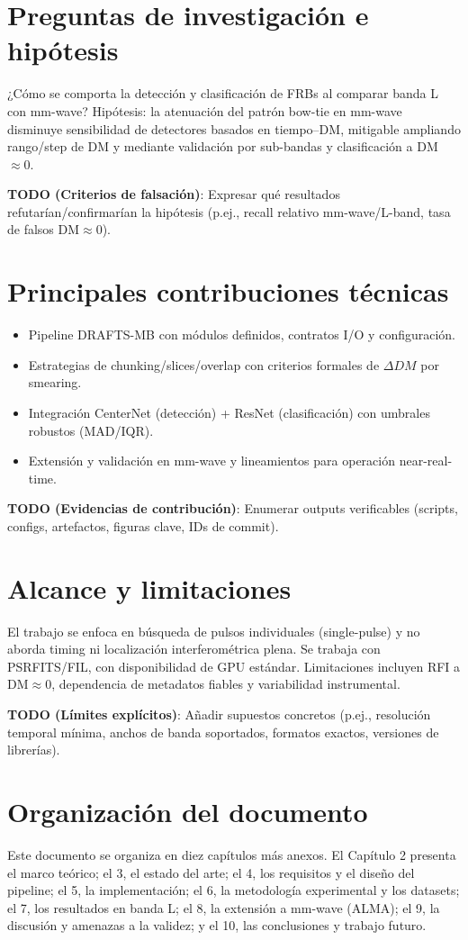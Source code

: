 \section{Preguntas de investigación e hipótesis}
¿Cómo se comporta la detección y clasificación de FRBs al comparar banda L con mm-wave? Hipótesis: la atenuación del patrón bow-tie en mm-wave disminuye sensibilidad de detectores basados en tiempo–DM, mitigable ampliando rango/step de DM y mediante validación por sub-bandas y clasificación a DM\(\approx 0\).

\textbf{TODO (Criterios de falsación)}: Expresar qué resultados refutarían/confirmarían la hipótesis (p.ej., recall relativo mm-wave/L-band, tasa de falsos DM\(\approx\)0).

\section{Principales contribuciones técnicas}
\begin{itemize}
  \item Pipeline DRAFTS-MB con módulos definidos, contratos I/O y configuración.
  \item Estrategias de chunking/slices/overlap con criterios formales de \(\Delta DM\) por smearing.
  \item Integración CenterNet (detección) + ResNet (clasificación) con umbrales robustos (MAD/IQR).
  \item Extensión y validación en mm-wave y lineamientos para operación near-real-time.
\end{itemize}

\textbf{TODO (Evidencias de contribución)}: Enumerar outputs verificables (scripts, configs, artefactos, figuras clave, IDs de commit).

\section{Alcance y limitaciones}
El trabajo se enfoca en búsqueda de pulsos individuales (single-pulse) y no aborda timing ni localización interferométrica plena. Se trabaja con PSRFITS/FIL, con disponibilidad de GPU estándar. Limitaciones incluyen RFI a DM\(\approx 0\), dependencia de metadatos fiables y variabilidad instrumental.

\textbf{TODO (Límites explícitos)}: Añadir supuestos concretos (p.ej., resolución temporal mínima, anchos de banda soportados, formatos exactos, versiones de librerías).

\section{Organización del documento}
Este documento se organiza en diez capítulos más anexos. El Capítulo 2 presenta el marco teórico; el 3, el estado del arte; el 4, los requisitos y el diseño del pipeline; el 5, la implementación; el 6, la metodología experimental y los datasets; el 7, los resultados en banda L; el 8, la extensión a mm-wave (ALMA); el 9, la discusión y amenazas a la validez; y el 10, las conclusiones y trabajo futuro.

